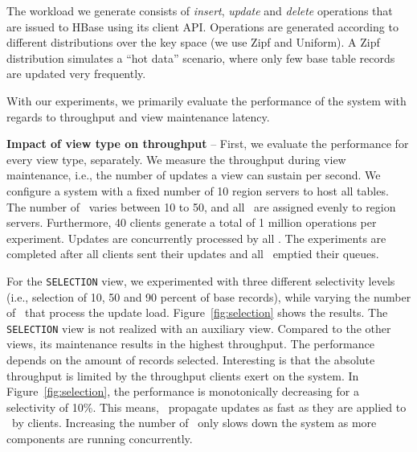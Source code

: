 The workload we generate consists of \textit{insert}, \textit{update}
and \textit{delete} operations that are issued to HBase using its
client API. Operations are generated according to different
distributions over the key space (we use Zipf and Uniform).  A Zipf
distribution simulates a ``hot data'' scenario, where only few base
table records are updated very frequently.



With our experiments, we primarily evaluate the performance of the
system with regards to throughput and view maintenance latency.

\noindent
{\bf Impact of view type on throughput} -- First, we evaluate the
performance for every view type, separately. We measure the throughput
during view maintenance, i.e., the number of updates a view can
sustain per second.  We configure a system with a fixed number of 10
region servers to host all tables. The number of \VMs\ varies between 10
to 50, and all \VMs\ are assigned evenly to region servers. Furthermore,
40 clients generate a total of 1 million operations per
experiment. Updates are concurrently processed by all \VMs. The
experiments are completed after all clients sent their updates and all
\VMs\ emptied their queues.

For the \texttt{SELECTION} view, we experimented with three different
selectivity levels (i.e., selection of 10, 50 and 90 percent of base
records), while varying the number of \VMs\ that process the update
load. Figure~\ref{fig:selection} shows the results.  The
\texttt{SELECTION} view is not realized with an auxiliary
view. Compared to the other views, its maintenance results in the
highest throughput.  The performance depends on the amount of records
selected. Interesting is that the absolute throughput is limited by
the throughput clients exert on the system. In
Figure~\ref{fig:selection}, the performance is monotonically
decreasing for a selectivity of 10\%. This means, \VMs\ propagate
updates as fast as they are applied to \HB\ by clients. Increasing
the number of \VMs\ only slows down the system as more components are
running concurrently.

